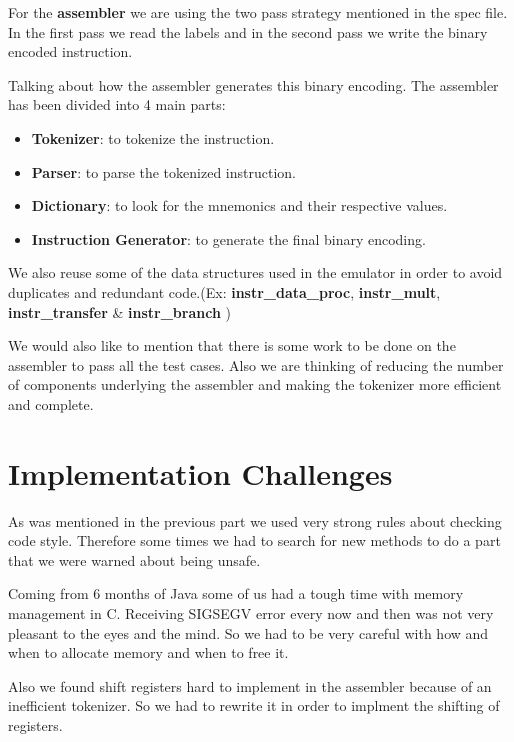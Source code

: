 \documentclass[11pt]{article}
\begin{document}
For the \textbf{assembler} we are using the two pass strategy mentioned in the
spec file. In the first pass we read the labels and in the second pass we write
the binary encoded instruction.

Talking about how the assembler generates this binary encoding. The assembler
has been divided into 4 main parts:
\begin{itemize}[noitemsep,topsep=0pt]
	\item \textbf{Tokenizer}:
		to tokenize the instruction.
	\item \textbf{Parser}:
		to parse the tokenized instruction.
	\item \textbf{Dictionary}:
		to look for the mnemonics and their respective values.
	\item \textbf{Instruction Generator}:
		to generate the final binary encoding.
\end{itemize}

We also reuse some of the data structures used in the emulator in order to
avoid duplicates and redundant code.(Ex:
\textbf{instr\_data\_proc},
\textbf{instr\_mult},
\textbf{instr\_transfer} \&
\textbf{instr\_branch}
)

We would also like to mention that there is some work to be done on the
assembler to pass all the test cases. Also we are thinking of reducing the
number of components underlying the assembler and making the tokenizer more
efficient and complete.

\section{Implementation Challenges}

As was mentioned in the previous part we used very strong rules about checking
code style. Therefore some times we had to search for new methods to do a part
that we were warned about being unsafe.

Coming from 6 months of Java some of us had a tough time with memory management
in C. Receiving SIGSEGV error every now and then was not very pleasant to the
eyes and the mind. So we had to be very careful with how and when to allocate
memory and when to free it.

Also we found shift registers hard to implement in the assembler because of an
inefficient tokenizer. So we had to rewrite it in order to implment the
shifting of registers.
\end{document}
